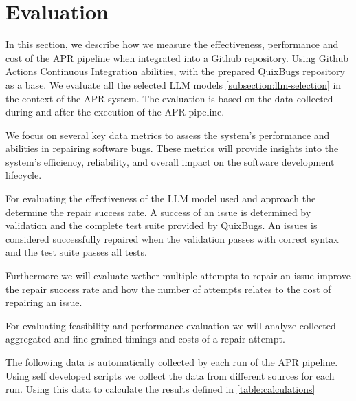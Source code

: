 \section{Evaluation} \label{section:evaluation}

In this section, we describe how we measure the effectiveness, performance and cost of the APR pipeline when integrated into a Github repository. Using Github Actions Continuous Integration abilities, with the prepared QuixBugs repository as a base. We evaluate all the selected LLM models \ref{subsection:llm-selection} in the context of the APR system. The evaluation is based on the data collected during and after the execution of the APR pipeline.

We focus on several key data metrics to assess the system's performance and abilities in repairing software bugs. These metrics will provide insights into the system's efficiency, reliability, and overall impact on the software development lifecycle.

For evaluating the effectiveness of the LLM model used and approach the determine the repair success rate. A success of an issue is determined by validation and the complete test suite provided by QuixBugs. An issues is considered successfully repaired when the validation passes with correct syntax and the test suite passes all tests.

Furthermore we will evaluate wether multiple attempts to repair an issue improve the repair success rate and how the number of attempts relates to the cost of repairing an issue.

For evaluating feasibility and performance evaluation we will analyze collected aggregated and fine grained timings and costs of a repair attempt.

The following data is automatically collected by each run of the APR pipeline. Using self developed scripts we collect the data from different sources for each run. Using this data to calculate the results defined in \ref{table:calculations}

